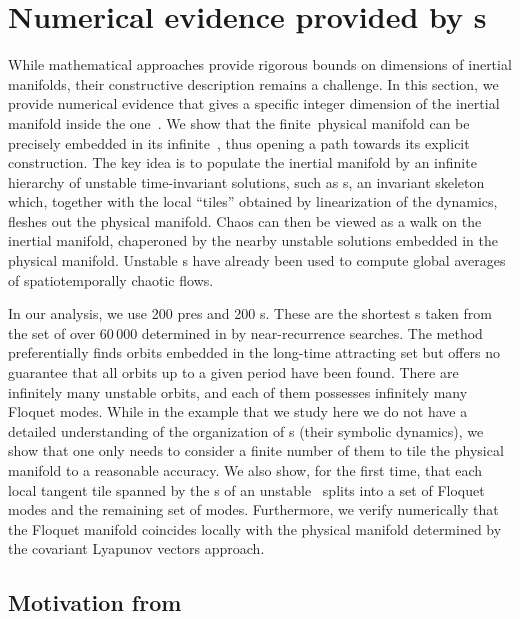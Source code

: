 \section{Numerical evidence provided by \Fv s}
\label{sect:ksdim}

While mathematical approaches
provide rigorous bounds on dimensions of inertial manifolds, their
constructive description remains a challenge. In this section,
we provide numerical evidence that gives a specific integer dimension
of the inertial manifold inside the one\dmn\ \KSe.
We show that the
finite\dmn\ physical manifold can be precisely embedded in its
infinite\dmn\ \statesp, thus opening a path towards its explicit
construction. The key idea is to populate the inertial
manifold by an infinite hierarchy of unstable time-invariant solutions,
such as \po s, an invariant skeleton which, together
with the local ``tiles'' obtained by linearization of the dynamics,
fleshes out the physical manifold. Chaos can then be viewed as a walk on
the inertial manifold, chaperoned by the nearby unstable solutions
embedded in the physical manifold.
Unstable \po s have already been
used to compute global averages of spatiotemporally chaotic flows.

In our analysis, we use 200 pre\po s and 200
\rpo s. These are the shortest \po s taken from the set of
over 60\,000 determined in  by near-recurrence searches.
The method preferentially finds orbits embedded in the long-time
attracting set but offers no guarantee that all orbits up to a given
period have been found.
There are infinitely many unstable orbits, and each of them
{possesses} infinitely many Floquet modes. While in the example that we
study here we do not have a detailed understanding of the organization of
\po s (their symbolic dynamics), we
show that one only needs to consider a finite number of
them to tile the physical manifold to a reasonable accuracy.
We also show, for the first time, that each local tangent tile spanned by
the \Fv s of an unstable \po\ splits into a set of
{\entangled} Floquet modes  and the remaining set of {\transient} modes.
Furthermore, we verify numerically that the {\entangled} Floquet manifold
coincides locally with the physical manifold determined by the covariant
Lyapunov vectors approach.


\subsection{Motivation from \cLvs}

